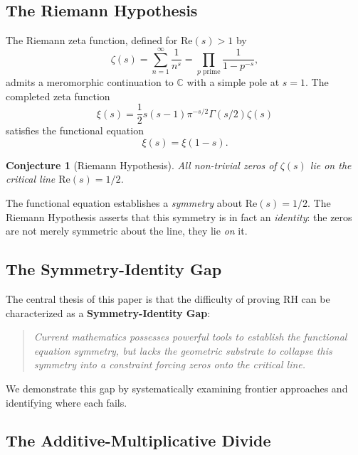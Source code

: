 \documentclass[12pt, a4paper]{article}
\newtheorem{conjecture}[theorem]{Conjecture}
\theoremstyle{definition}
\newcommand{\C}{\mathbb{C}}
\newcommand{\re}{\mathrm{Re}}
\begin{document}
\subsection{The Riemann Hypothesis}

The Riemann zeta function, defined for $\re(s) > 1$ by
\begin{equation}
\zeta(s) = \sum_{n=1}^{\infty} \frac{1}{n^s} = \prod_{p \text{ prime}} \frac{1}{1 - p^{-s}},
\end{equation}
admits a meromorphic continuation to $\C$ with a simple pole at $s = 1$. The completed zeta function
\begin{equation}
\xi(s) = \frac{1}{2} s(s-1) \pi^{-s/2} \Gamma(s/2) \zeta(s)
\end{equation}
satisfies the functional equation
\begin{equation}
\xi(s) = \xi(1-s).
\end{equation}

\begin{conjecture}[Riemann Hypothesis]
All non-trivial zeros of $\zeta(s)$ lie on the critical line $\re(s) = 1/2$.
\end{conjecture}

The functional equation establishes a \textit{symmetry} about $\re(s) = 1/2$. The Riemann Hypothesis asserts that this symmetry is in fact an \textit{identity}: the zeros are not merely symmetric about the line, they lie \textit{on} it.

\subsection{The Symmetry-Identity Gap}

The central thesis of this paper is that the difficulty of proving RH can be characterized as a \textbf{Symmetry-Identity Gap}:

\begin{quote}
\textit{Current mathematics possesses powerful tools to establish the functional equation symmetry, but lacks the geometric substrate to collapse this symmetry into a constraint forcing zeros onto the critical line.}
\end{quote}

We demonstrate this gap by systematically examining frontier approaches and identifying where each fails.

\subsection{The Additive-Multiplicative Divide}
\end{document}
